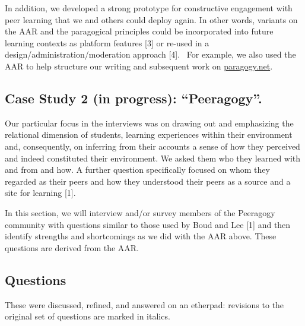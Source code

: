 In addition, we developed a strong prototype for constructive engagement
with peer learning that we and others could deploy again. In other
words, variants on the AAR and the paragogical principles could be
incorporated into future learning contexts as platform features {[}3{]}
or re-used in a design/administration/moderation approach {[}4{]}.~ For
example, we also used the AAR to help structure our writing and
subsequent work on \href{http://paragogy.net}{paragogy.net}.

\subsection{Case Study 2 (in progress): ``Peeragogy''.}

Our particular focus in the interviews was on drawing out and
emphasizing the relational dimension of students, learning experiences
within their environment and, consequently, on inferring from their
accounts a sense of how they perceived and indeed constituted their
environment. We asked them who they learned with and from and how. A
further question specifically focused on whom they regarded as their
peers and how they understood their peers as a source and a site for
learning {[}1{]}.

In this section, we will interview and/or survey members of the
Peeragogy community with questions similar to those used by Boud and Lee
{[}1{]} and then identify strengths and shortcomings as we did with the
AAR above. These questions are derived from the AAR.

\subsection{Questions}

These were discussed, refined, and answered on an etherpad: revisions to
the original set of questions are marked in italics.

